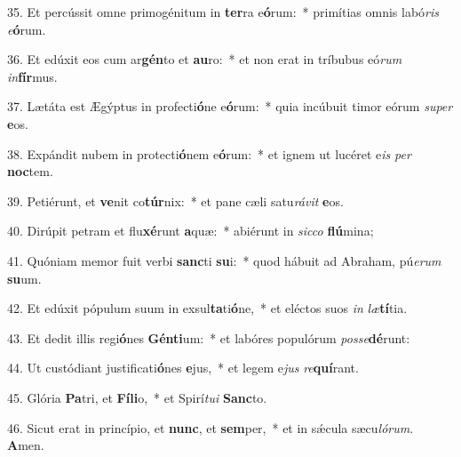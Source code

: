 35. Et percússit omne primogénitum in \textbf{ter}ra e\textbf{ó}rum:~*  primítias omnis labó\textit{ris} \textit{e}\textbf{ó}rum.\

36. Et edúxit eos cum ar\textbf{gén}to et \textbf{au}ro:~*  et non erat in tríbubus eó\textit{rum} \textit{in}\textbf{fír}mus.\

37. Lætáta est Ægýptus in profecti\textbf{ó}ne e\textbf{ó}rum:~*  quia incúbuit timor eórum \textit{su}\textit{per} \textbf{e}os.\

38. Expándit nubem in protecti\textbf{ó}nem e\textbf{ó}rum:~*  et ignem ut lucéret e\textit{is} \textit{per} \textbf{noc}tem.\

39. Petiérunt, et \textbf{ve}nit co\textbf{túr}nix:~*  et pane cæli satu\textit{rá}\textit{vit} \textbf{e}os.\

40. Dirúpit petram et flu\textbf{xé}runt \textbf{a}quæ:~*  abiérunt in \textit{sic}\textit{co} \textbf{flú}mina;\

41. Quóniam memor fuit verbi \textbf{sanc}ti \textbf{su}i:~*  quod hábuit ad Abraham, pú\textit{e}\textit{rum} \textbf{su}um.\

42. Et edúxit pópulum suum in exsul\textbf{ta}ti\textbf{ó}ne,~*  et eléctos suos \textit{in} \textit{læ}\textbf{tí}tia.\

43. Et dedit illis regi\textbf{ó}nes \textbf{Gén}\textbf{ti}um:~*  et labóres populórum \textit{pos}\textit{se}\textbf{dé}runt:\

44. Ut custódiant justificati\textbf{ó}nes \textbf{e}jus,~*  et legem e\textit{jus} \textit{re}\textbf{quí}rant.\

45. Glória \textbf{Pa}tri, et \textbf{Fí}\textbf{li}o,~*  et Spirí\textit{tu}\textit{i} \textbf{Sanc}to.\

46. Sicut erat in princípio, et \textbf{nunc}, et \textbf{sem}per,~*  et in sǽcula sæcu\textit{ló}\textit{rum}. \textbf{A}men.\

